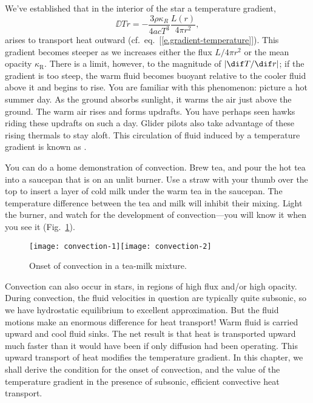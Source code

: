 
We've established that in the interior of the star a temperature gradient,
\[
	\DD{T}{r} = -\frac{3\rho\kappa_{R}}{4acT^3}\frac{L(r)}{4\pi r^2},
\]
arises to transport heat outward (cf.\ eq.~[\ref{e.gradient-temperature}]).
This gradient becomes steeper as we increases either the flux $L/4\pi r^{2}$ or the mean opacity $\kappa_{\mathrm{R}}$. There is a limit, however, to the magnitude of $|\dif T/\dif r|$; if the gradient is too steep, the warm fluid becomes buoyant relative to the cooler fluid above it and begins to rise. You are familiar with this phenomenon: picture a hot summer day. As the ground absorbs sunlight, it warms the air just above the ground. The warm air rises and forms updrafts. You have perhaps seen hawks riding these updrafts on such a day. Glider pilots also take advantage of these rising thermals to stay aloft. This circulation of fluid induced by a temperature gradient is known as . 

You can do a home demonstration of convection.  Brew tea, and pour the hot tea into a saucepan that is on an unlit burner. Use a straw with your thumb over the top to insert a layer of cold milk under the warm tea in the saucepan. The temperature difference between the tea and milk will inhibit their mixing. Light the burner, and watch for the development of convection---you will know it when you see it (Fig.~\ref{f.tea}).

\begin{figure}[htbp]
\texttt{[image: convection-1]}\texttt{[image: convection-2]}
\caption{Onset of convection in a tea-milk mixture.\label{f.tea}}
\end{figure}

Convection can also occur in stars, in regions of high flux and/or high opacity. During convection, the fluid velocities in question are typically quite subsonic, so we have hydrostatic equilibrium to excellent approximation. But the fluid motions make an enormous difference for heat transport! Warm fluid is carried upward and cool fluid sinks. The net result is that heat is transported upward much faster than it would have been if only diffusion had been operating. This upward transport of heat modifies the temperature gradient. In this chapter, we shall derive the condition for the onset of convection, and the value of the temperature gradient in the presence of subsonic, efficient convective heat transport.

